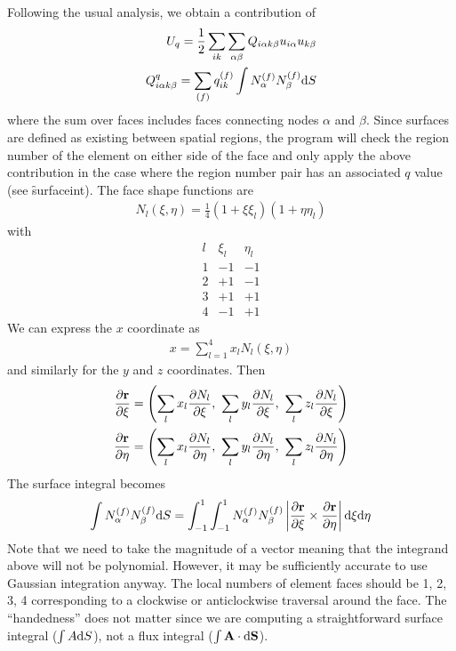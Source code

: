 \documentclass[a4paper]{article}
\begin{document}
Following the usual analysis, we obtain a contribution of
\begin{eqnarray}
U_q=\frac12\sum_{ik}\sum_{\alpha\beta}Q_{i\alpha k\beta} u_{i\alpha}u_{k\beta}\\
Q_{i\alpha k\beta}^q=\sum_{(f)}q_{ik}^{(f)}\int N_\alpha^{(f)}N_\beta^{(f)}\mathrm{d} S
\end{eqnarray}
where the sum over faces includes faces connecting nodes $\alpha$ and
$\beta$. Since surfaces are defined as existing between spatial
regions, the program will check the region number of the element on
either side of the face and only apply the above contribution in the
case where the region number pair has an associated $q$ value (see \f{surfaceint}). The
face shape functions are
\begin{eqnarray}
  N_l(\xi,\eta)=\frac14(1+\xi\xi_l)(1+\eta\eta_l)
\end{eqnarray}
with
\begin{equation}
\begin{array}{ccc}
  l & \xi_l & \eta_l\\
1 & -1 & -1 \\
2 & +1 & -1 \\
3 & +1 & +1 \\
4 & -1 & +1
\end{array}  
\end{equation}
We can express the $x$ coordinate as
\begin{eqnarray}
  x=\sum_{l=1}^4 x_l N_l(\xi,\eta)
\end{eqnarray}
and similarly for the $y$ and $z$ coordinates. Then
\begin{eqnarray}
  \frac{\partial\mathbf{r}}{\partial\xi}=\left(\sum_l x_l\frac{\partial N_l}{\partial\xi},~
\sum_l y_l\frac{\partial N_l}{\partial\xi},~
\sum_l z_l\frac{\partial N_l}{\partial\xi}\right)\\
  \frac{\partial\mathbf{r}}{\partial\eta}=\left(\sum_l x_l\frac{\partial N_l}{\partial\eta},~
\sum_l y_l\frac{\partial N_l}{\partial\eta},~
\sum_l z_l\frac{\partial N_l}{\partial\eta}\right)\\
\end{eqnarray}
The surface integral becomes
\begin{eqnarray}
  \int N_\alpha^{(f)}N_\beta^{(f)}\mathrm{d} S
=\int_{-1}^1\int_{-1}^1 N_\alpha^{(f)}N_\beta^{(f)}
\left|\frac{\partial\mathbf{r}}{\partial\xi}\times
\frac{\partial\mathbf{r}}{\partial\eta}\right|\mathrm{d}\xi\mathrm{d}\eta
\end{eqnarray}
Note that we need to take the magnitude of a vector meaning that the
integrand above will not be polynomial. However, it may be
sufficiently accurate to use Gaussian integration anyway. The local
numbers of element faces should be 1, 2, 3, 4 corresponding to a clockwise
or anticlockwise traversal around the face. The ``handedness'' does not
matter since we are computing a straightforward surface integral
($\int A\mathrm{d} S$), not a flux integral ($\int \mathbf{A}\cdot\mathrm{d}\mathbf{S}$).
\end{document}
